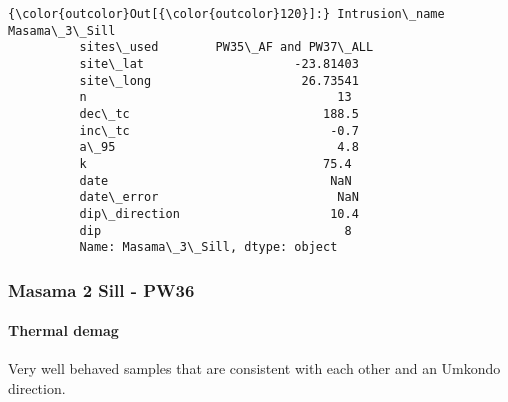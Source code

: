 \documentclass{article}
\begin{document}
            \begin{Verbatim}[commandchars=\\\{\}]
{\color{outcolor}Out[{\color{outcolor}120}]:} Intrusion\_name           Masama\_3\_Sill
          sites\_used        PW35\_AF and PW37\_ALL
          site\_lat                     -23.81403
          site\_long                     26.73541
          n                                   13
          dec\_tc                           188.5
          inc\_tc                            -0.7
          a\_95                               4.8
          k                                 75.4
          date                               NaN
          date\_error                         NaN
          dip\_direction                     10.4
          dip                                  8
          Name: Masama\_3\_Sill, dtype: object
\end{Verbatim}
        
    \subsubsection{Masama 2 Sill - PW36}\label{masama-2-sill---pw36}

    \paragraph{Thermal demag}\label{thermal-demag}

    Very well behaved samples that are consistent with each other and an
Umkondo direction.
\end{document}
